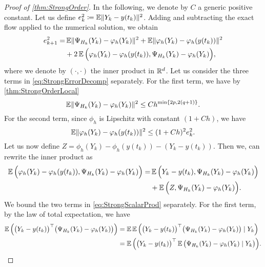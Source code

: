 \documentclass[final,onefignum,onetabnum]{siamonline171218}
\begin{document}
\begin{proof}[Proof of \cref{thm:StrongOrder}] In the following, we denote by $C$ a generic positive constant. Let us define $e_k^2 \coloneqq \operatorname{\mathbb{E}}\lVert Y_k - y(t_k)\rVert^2$. Adding and subtracting the exact flow applied to the numerical solution, we obtain
	\begin{equation}\label{eq:StrongErrorDecomp}
		\begin{aligned}
			e_{k+1}^2 = &\E\norm{\Psi_{H_k}(Y_k) - \phi_{h}(Y_k)}^2 + \E\norm{\phi_{h}(Y_k) - \phi_{h}(y(t_k))}^2 \\
					  &+ 2\E\Big(\phi_{h}(Y_k) - \phi_{h}(y(t_k)), \Psi_{H_k}(Y_k) - \phi_{h}(Y_k)\Big),
		\end{aligned}
	\end{equation}
	where we denote by $(\cdot, \cdot)$ the inner product in $\mathbb{R}^d$. Let us consider the three terms in \eqref{eq:StrongErrorDecomp} separately. For the first term, we have by \cref{thm:StrongOrderLocal}
	\begin{equation}\label{eq:StrongFirstTerm}
		\E\norm{\Psi_{H_k}(Y_k) - \phi_{h}(Y_k)}^2 \leq Ch^{\min\{2p, 2(q+1)\}}.
	\end{equation}
    For the second term, since $\phi_h$ is Lipschitz with constant $(1 + Ch)$, we have
	\begin{equation}\label{eq:StrongSecondTerm}
		\E\norm{\phi_{h}(Y_k) - \phi_{h}(y(t_k))}^2 \leq (1 + Ch)^2 e_k^2.
	\end{equation}
	Let us now define $Z = \phi_{h}(Y_k) - \phi_{h}(y(t_k)) - (Y_k - y(t_k))$. Then we, can rewrite the inner product as
	\begin{equation}\label{eq:StrongScalarProd}
	\begin{aligned}
		\E\Big(\phi_{h}(Y_k) - \phi_{h}(y(t_k)), \Psi_{H_k}(Y_k) - \phi_{h}(Y_k)\Big) = &\E\Big(Y_k - y(t_k), \Psi_{H_k}(Y_k) - \phi_{h}(Y_k)\Big) \\
		&+ \E\Big(Z, \Psi_{H_k}(Y_k) - \phi_{h}(Y_k)\Big).
	\end{aligned}
	\end{equation}
	We bound the two terms in \eqref{eq:StrongScalarProd} separately. For the first term, by the law of total expectation, we have
	\begin{equation}
	\begin{aligned}
		\E\Big(\big(Y_k - y(t_k)\big)^\top \big(\Psi_{H_k}(Y_k) - \phi_{h}(Y_k)\big)\Big) &= \E\E\Big(\big(Y_k - y(t_k)\big)^\top \big(\Psi_{H_k}(Y_k) - \phi_{h}(Y_k)\big) \mid Y_k\Big)\\
		&= \E\Big(\big(Y_k - y(t_k)\big)^\top\E \big(\Psi_{H_k}(Y_k) - \phi_{h}(Y_k) \mid Y_k \big)\Big).

\end{aligned}
\end{equation}
\end{proof}
\end{document}
